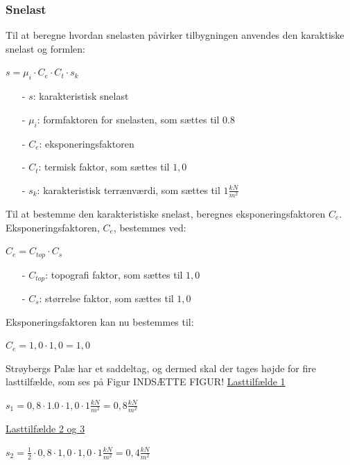 \subsubsection{Snelast}
Til at beregne hvordan snelasten påvirker tilbygningen anvendes den karaktiske snelast og formlen:
\begin{center}
$s=\mu_i\cdot C_e\cdot C_t \cdot s_k$
\end{center}
\begin{itemize}
	\item[-] $s$: karakteristisk snelast
	\item[-] $\mu_i$: formfaktoren for snelasten, som sættes til 0.8 \citep[ tabel 5.2 kapitel 5.3]{EU91}
	\item[-] $C_e$: eksponeringsfaktoren
	\item[-] $C_t$: termisk faktor, som sættes til $1,\!0$ \citep[ kapitel 5.2]{EU91}
	\item[-] $s_k$: karakteristisk terrænværdi, som sættes til $1 \frac{kN}{m^2}$ \citep[ kapitel 4.1]{EU91}
\end{itemize}
Til at bestemme den karakteristiske snelast, beregnes eksponeringsfaktoren $C_e$.
\newline
\newline
Eksponeringsfaktoren, $C_e$, bestemmes ved:
\begin{center}
$C_e=C_{top}\cdot C_s$
\end{center}
\begin{itemize}
	\item[-] $C_{top}$: topografi faktor, som sættes til $1,\!0$ \citep[ tabel 5.1 kapitel 5.2]{EU91}
	\item[-] $C_s$: størrelse faktor, som sættes til $1,\!0$ \citep[ kapitel 5.2]{EU91}
\end{itemize}
Eksponeringsfaktoren kan nu bestemmes til:
\begin{center}
$C_e=1,\!0\cdot 1,\!0=1,\!0$
\end{center}
Strøybergs Palæ har et saddeltag, og dermed skal der tages højde for fire lasttilfælde, som ses på Figur INDSÆTTE FIGUR!
\newline
\newline
\underline{Lasttilfælde 1}
\begin{center}
$s_1=0,\!8\cdot 1.0\cdot 1,\!0\cdot 1 \frac{kN}{m^2}=0,\!8 \frac{kN}{m^2}$
\end{center}
\underline{Lasttilfælde 2 og 3}
\begin{center}
$s_2=\frac{1}{2}\cdot 0,\!8\cdot 1,\!0\cdot 1,\!0\cdot 1 \frac{kN}{m^2}=0,\!4 \frac{kN}{m^2}$
\end{center}
